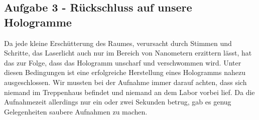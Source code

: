 \subsection*{Aufgabe 3 - Rückschluss auf unsere Hologramme}
Da jede kleine Erschütterung des Raumes, verursacht durch Stimmen und Schritte, das Laserlicht auch nur im Bereich von Nanometern erzittern lässt, hat das zur Folge, dass das Hologramm unscharf und verschwommen wird. Unter diesen Bedingungen ist eine erfolgreiche Herstellung eines Hologramms nahezu ausgeschlossen. Wir mussten bei der Aufnahme immer darauf achten, dass sich niemand im Treppenhaus befindet und niemand an dem Labor vorbei lief. Da die Aufnahmezeit allerdings nur ein oder zwei Sekunden betrug, gab es genug Gelegenheiten saubere Aufnahmen zu machen.